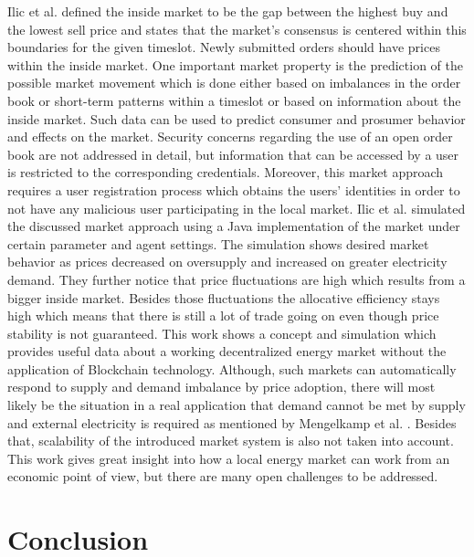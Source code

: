 \documentclass[runningheads]{llncs}
\begin{document}
Ilic et al. \cite{ilic_smart_grid_neighbourhoods} defined the inside market to be the gap between the highest buy and the lowest sell price and states that the market’s consensus is centered within this boundaries for the given timeslot. Newly submitted orders should have prices within the inside market.
One important market property is the prediction of the possible market movement which is done either based on imbalances in the order book or short-term patterns within a timeslot or based on information about the inside market. Such data can be used to predict consumer and prosumer behavior and effects on the market. \newline
Security concerns regarding the use of an open order book are not addressed in detail, but information that can be accessed by a user is restricted to the corresponding credentials. Moreover, this market approach requires a user registration process which obtains the users’ identities in order to not have any malicious user participating in the local market. \newline
Ilic et al. \cite{ilic_smart_grid_neighbourhoods} simulated the discussed market approach using a Java implementation of the market under certain parameter and agent settings. The simulation shows desired market behavior as prices decreased on oversupply and increased on greater electricity demand. They further notice that price fluctuations are high which results from a bigger inside market. Besides those fluctuations the allocative efficiency stays high which means that there is still a lot of trade going on even though price stability is not guaranteed. \newline
This work shows a concept and simulation which provides useful data about a working decentralized energy market without the application of Blockchain technology. Although, such markets can automatically respond to supply and demand imbalance by price adoption, there will most likely be the situation in a real application that demand cannot be met by supply and external electricity is required as mentioned by Mengelkamp et al. \cite{mengelkamp_lem}. Besides that, scalability of the introduced market system is also not taken into account. This work gives great insight into how a local energy market can work from an economic point of view, but there are many open challenges to be addressed.



\section{Conclusion}
\end{document}
